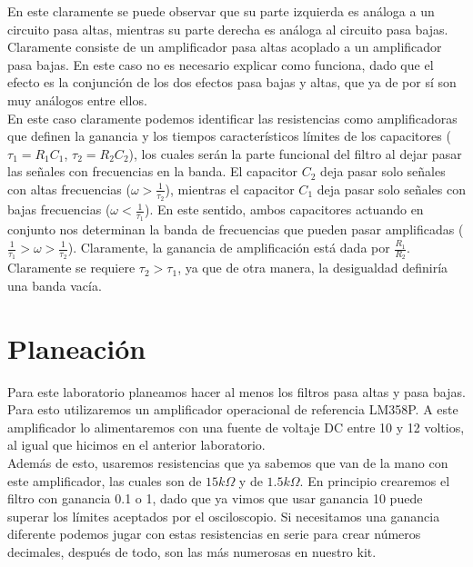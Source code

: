 \documentclass[prb,aps,preprintnumbers,amsmath,amssymb]{revtex4}
\begin{document}
En este claramente se puede observar que su parte izquierda es análoga a un circuito pasa altas, mientras su parte derecha es análoga al circuito pasa bajas. Claramente consiste de un amplificador pasa altas acoplado a un amplificador pasa bajas. En este caso no es necesario explicar como funciona, dado que el efecto es la conjunción de los dos efectos pasa bajas y altas, que ya de por sí son muy análogos entre ellos.\\

En este caso claramente podemos identificar las resistencias como amplificadoras que definen la ganancia y los tiempos característicos límites de los capacitores ($\tau_1 = R_1C_1$, $\tau_2 = R_2C_2$), los cuales serán la parte funcional del filtro al dejar pasar las señales con frecuencias en la banda. El capacitor $C_2$ deja pasar solo señales con altas frecuencias ($\omega > \frac{1}{\tau_2}$), mientras el capacitor $C_1$ deja pasar solo señales con bajas frecuencias ($\omega < \frac{1}{\tau_1}$). En este sentido, ambos capacitores actuando en conjunto nos determinan la banda de frecuencias que pueden pasar amplificadas ($\frac{1}{\tau_1} > \omega > \frac{1}{\tau_2}$). Claramente, la ganancia de amplificación está dada por $\frac{R_1}{R_2}$. \\

Claramente se requiere $\tau_2 > \tau_1$, ya que de otra manera, la desigualdad definiría una banda vacía.\\

\section{Planeación}
Para este laboratorio planeamos hacer al menos los filtros pasa altas y pasa bajas. Para esto utilizaremos un amplificador operacional de referencia LM358P. A este amplificador lo alimentaremos con una fuente de voltaje DC entre 10 y 12 voltios, al igual que hicimos en el anterior laboratorio.\\

Además de esto, usaremos resistencias que ya sabemos que van de la mano con este amplificador, las cuales son de $15k\Omega$ y de $1.5k\Omega$. En principio crearemos el filtro con ganancia 0.1 o 1, dado que ya vimos que usar ganancia 10 puede superar los límites aceptados por el osciloscopio. Si necesitamos una ganancia diferente podemos jugar con estas resistencias en serie para crear números decimales, después de todo, son las más numerosas en nuestro kit.\\
\end{document}

